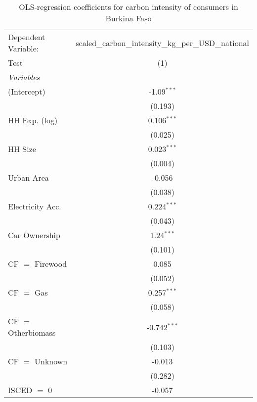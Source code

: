 
\begin{table}[htbp!]
   \centering
   \small
   \begin{adjustbox}{width = 1\textwidth, max height = 0.95\textheight, center}
      \begin{threeparttable}[b]
         \caption{\label{tab:OLS_1_BFA} OLS-regression coefficients for carbon intensity of consumers in Burkina Faso}
         \begin{tabular}{lc}
            \tabularnewline \midrule \midrule
            Dependent Variable: & scaled\_carbon\_intensity\_kg\_per\_USD\_national\\        
            Test                & (1)\\  
            \midrule
            \emph{Variables}\\
            (Intercept)         & -1.09$^{***}$\\   
                                & (0.193)\\   
            HH Exp. (log)       & 0.106$^{***}$\\   
                                & (0.025)\\   
            HH Size             & 0.023$^{***}$\\   
                                & (0.004)\\   
            Urban Area          & -0.056\\   
                                & (0.038)\\   
            Electricity Acc.    & 0.224$^{***}$\\   
                                & (0.043)\\   
            Car Ownership       & 1.24$^{***}$\\   
                                & (0.101)\\   
            CF $=$ Firewood     & 0.085\\   
                                & (0.052)\\   
            CF $=$ Gas          & 0.257$^{***}$\\   
                                & (0.058)\\   
            CF $=$ Otherbiomass & -0.742$^{***}$\\   
                                & (0.103)\\   
            CF $=$ Unknown      & -0.013\\   
                                & (0.282)\\   
            ISCED $=$ 0         & -0.057\\   

\end{tabular}
\end{threeparttable}
\end{adjustbox}
\end{table}
